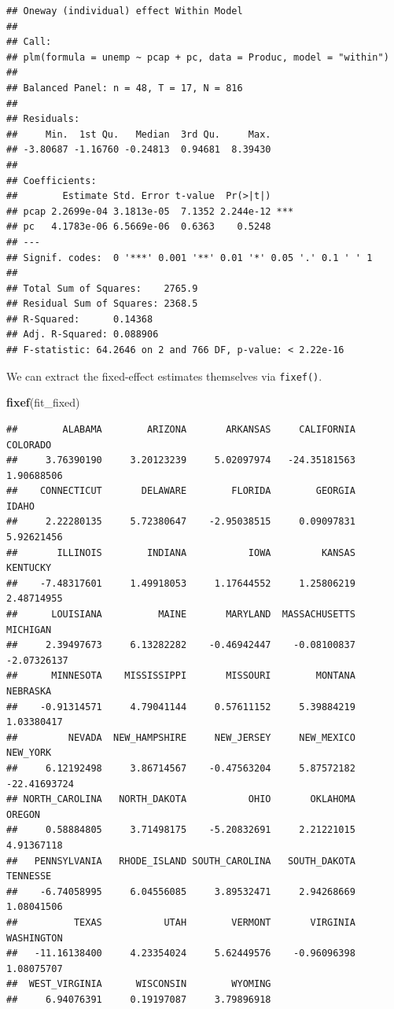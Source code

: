 \documentclass[12pt,oneside,openany]{book}
\newenvironment{Shaded}{\begin{snugshade}}{\end{snugshade}}
\newcommand{\KeywordTok}[1]{\textcolor[rgb]{0.13,0.29,0.53}{\textbf{#1}}}
\newcommand{\NormalTok}[1]{#1}
\begin{document}
\begin{verbatim}
## Oneway (individual) effect Within Model
## 
## Call:
## plm(formula = unemp ~ pcap + pc, data = Produc, model = "within")
## 
## Balanced Panel: n = 48, T = 17, N = 816
## 
## Residuals:
##     Min.  1st Qu.   Median  3rd Qu.     Max. 
## -3.80687 -1.16760 -0.24813  0.94681  8.39430 
## 
## Coefficients:
##        Estimate Std. Error t-value  Pr(>|t|)    
## pcap 2.2699e-04 3.1813e-05  7.1352 2.244e-12 ***
## pc   4.1783e-06 6.5669e-06  0.6363    0.5248    
## ---
## Signif. codes:  0 '***' 0.001 '**' 0.01 '*' 0.05 '.' 0.1 ' ' 1
## 
## Total Sum of Squares:    2765.9
## Residual Sum of Squares: 2368.5
## R-Squared:      0.14368
## Adj. R-Squared: 0.088906
## F-statistic: 64.2646 on 2 and 766 DF, p-value: < 2.22e-16
\end{verbatim}

We can extract the fixed-effect estimates themselves via
\texttt{fixef()}.

\begin{Shaded}
\begin{Highlighting}[]
\KeywordTok{fixef}\NormalTok{(fit_fixed)}
\end{Highlighting}
\end{Shaded}

\begin{verbatim}
##        ALABAMA        ARIZONA       ARKANSAS     CALIFORNIA       COLORADO 
##     3.76390190     3.20123239     5.02097974   -24.35181563     1.90688506 
##    CONNECTICUT       DELAWARE        FLORIDA        GEORGIA          IDAHO 
##     2.22280135     5.72380647    -2.95038515     0.09097831     5.92621456 
##       ILLINOIS        INDIANA           IOWA         KANSAS       KENTUCKY 
##    -7.48317601     1.49918053     1.17644552     1.25806219     2.48714955 
##      LOUISIANA          MAINE       MARYLAND  MASSACHUSETTS       MICHIGAN 
##     2.39497673     6.13282282    -0.46942447    -0.08100837    -2.07326137 
##      MINNESOTA    MISSISSIPPI       MISSOURI        MONTANA       NEBRASKA 
##    -0.91314571     4.79041144     0.57611152     5.39884219     1.03380417 
##         NEVADA  NEW_HAMPSHIRE     NEW_JERSEY     NEW_MEXICO       NEW_YORK 
##     6.12192498     3.86714567    -0.47563204     5.87572182   -22.41693724 
## NORTH_CAROLINA   NORTH_DAKOTA           OHIO       OKLAHOMA         OREGON 
##     0.58884805     3.71498175    -5.20832691     2.21221015     4.91367118 
##   PENNSYLVANIA   RHODE_ISLAND SOUTH_CAROLINA   SOUTH_DAKOTA       TENNESSE 
##    -6.74058995     6.04556085     3.89532471     2.94268669     1.08041506 
##          TEXAS           UTAH        VERMONT       VIRGINIA     WASHINGTON 
##   -11.16138400     4.23354024     5.62449576    -0.96096398     1.08075707 
##  WEST_VIRGINIA      WISCONSIN        WYOMING 
##     6.94076391     0.19197087     3.79896918
\end{verbatim}
\end{document}
